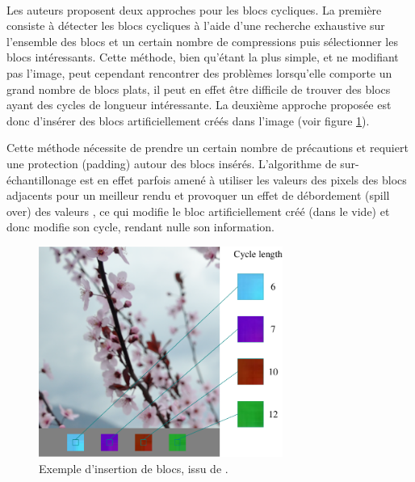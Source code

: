 \documentclass[utf8,final]{stageM2R} %
\begin{document}
\paragraph{}
Les auteurs proposent deux approches pour les blocs cycliques. La première consiste à détecter les blocs cycliques à l'aide d'une recherche exhaustive sur l'ensemble des blocs et un certain nombre de compressions puis sélectionner les blocs intéressants. Cette méthode, bien qu'étant la plus simple, et ne modifiant pas l'image, peut cependant rencontrer des problèmes lorsqu'elle comporte un grand nombre de blocs plats, il peut en effet être difficile de trouver des blocs ayant des cycles de longueur intéressante. La deuxième approche proposée est donc d'insérer des blocs artificiellement créés dans l'image (voir figure \ref{fig:insertion_blocs}). 

Cette méthode nécessite de prendre un certain nombre de précautions et requiert une protection (padding) autour des blocs insérés. L'algorithme de sur-échantillonage est en effet parfois amené à utiliser les valeurs des pixels des blocs adjacents pour un meilleur rendu et provoquer un effet de débordement (spill over) des valeurs \autocite{carnein2015forensics}, ce qui modifie le bloc artificiellement créé (dans le vide) et donc modifie son cycle, rendant nulle son information.

\begin{figure}[H]
  \begin{center}
    \includegraphics[width=80mm]{images/insertion_blocs}
    \caption{Exemple d'insertion de blocs, issu de \autocite{CarneinSB2016TelltaleWatermarks}.}
    \label{fig:insertion_blocs}
  \end{center}
\end{figure}


\paragraph{}
\end{document}
